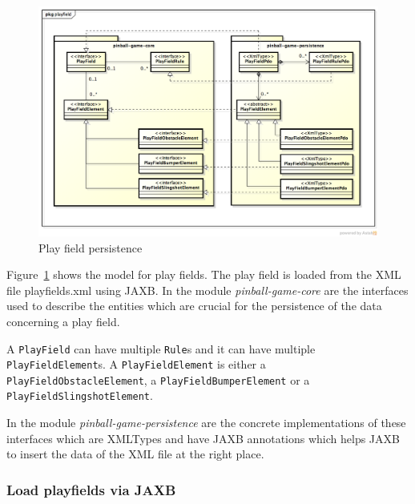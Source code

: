 \documentclass[fontsize=12pt,
               paper=a4,
               twoside=false,
               parskip=half,
               ]{scrartcl}
\begin{document}
\begin{figure}[H]
	\centering
	\includegraphics[width=15.5cm]{./img/persistence-playfield.png}
	\caption[Play field persistence]{Play field persistence}
	\label{fig:playfield_persistence}
\end{figure}

Figure~\ref{fig:playfield_persistence} shows the model for play fields. The play field is loaded from the XML file playfields.xml using JAXB. In the module \emph{pinball-game-core} are the interfaces used to describe the entities which are crucial for the persistence of the data concerning a play field.

A \texttt{PlayField} can have multiple \texttt{Rule}s and it can have multiple \texttt{PlayFieldElement}s. A \texttt{PlayFieldElement} is either a \texttt{PlayFieldObstacleElement}, a \texttt{PlayFieldBumperElement} or a \texttt{PlayFieldSlingshotElement}.

In the module \emph{pinball-game-persistence} are the concrete implementations of these interfaces which are XMLTypes and have JAXB annotations which helps JAXB to insert the data of the XML file at the right place.

\subsubsection{Load playfields via JAXB}
\end{document}
